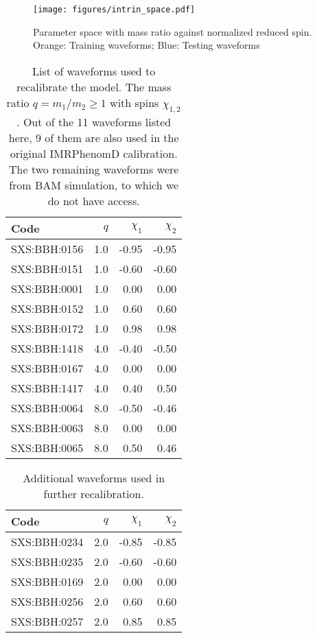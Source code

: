 \documentclass[twocolumn]{aastex631}
\begin{document}
\begin{figure}[t]
	\centering
	\texttt{[image: figures/intrin\_space.pdf]}
	\caption{Parameter space with mass ratio against normalized reduced spin. Orange: Training waveforms; Blue: Testing waveforms}
	\label{fig:intrin_space}
\end{figure}

\begin{table}[t]
	\centering
	\begin{tabularx}{0.8\columnwidth}{@{\extracolsep{\fill}}lrrr}
		\toprule\midrule Code         & $q$ & $\chi_1$ & $\chi_2$ \\
		\midrule\midrule SXS:BBH:0156 & 1.0 & -0.95    & -0.95    \\
		SXS:BBH:0151 & 1.0 & -0.60    & -0.60    \\
		SXS:BBH:0001 & 1.0 &  0.00    &  0.00    \\
		SXS:BBH:0152 & 1.0 &  0.60    &  0.60    \\
		SXS:BBH:0172 & 1.0 &  0.98    &  0.98    \\
		SXS:BBH:1418 & 4.0 & -0.40    & -0.50    \\
		SXS:BBH:0167 & 4.0 &  0.00    &  0.00    \\
		SXS:BBH:1417 & 4.0 &  0.40    &  0.50    \\
		SXS:BBH:0064 & 8.0 & -0.50    & -0.46    \\
		SXS:BBH:0063 & 8.0 &  0.00    &  0.00    \\
		SXS:BBH:0065 & 8.0 &  0.50    &  0.46    \\ \midrule\bottomrule
	\end{tabularx}
	\caption{List of waveforms used to recalibrate the model. The mass ratio
	$q=m_1/m_2\geq 1$ with spins $\chi_{1,2}$. Out of the 11 waveforms listed
	here, 9 of them are also used in the original IMRPhenomD calibration.
	\citep{khan2016frequency} The two remaining waveforms were from BAM
	simulation, to which we do not have access.}
	\label{tab:q148}
\end{table}
\begin{table}[t]
	\centering
	\begin{tabularx}{0.8\columnwidth}{@{\extracolsep{\fill}}lrrr}
		\toprule\midrule Code         & $q$ & $\chi_1$ & $\chi_2$ \\
		\midrule\midrule SXS:BBH:0234 & 2.0 & -0.85    & -0.85    \\
		SXS:BBH:0235 & 2.0 & -0.60    & -0.60    \\
		SXS:BBH:0169 & 2.0 & 0.00     & 0.00     \\
		SXS:BBH:0256 & 2.0 & 0.60     & 0.60     \\
		SXS:BBH:0257 & 2.0 & 0.85     & 0.85     \\ \midrule\bottomrule
	\end{tabularx}
	\caption{Additional waveforms used in further recalibration.}
	\label{tab:q1248}
\end{table}
\end{document}
